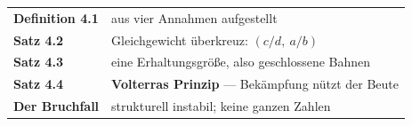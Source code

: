 \begin{merksatz}
\begin{center}
\renewcommand{\arraystretch}{1.5}
\begin{tabular}{@{}P{3.0cm}P{5.6cm}@{}}
\toprule
\textbf{Definition 4.1} & aus vier Annahmen aufgestellt\\
\textbf{Satz 4.2} & Gleichgewicht überkreuz: $(c/d,\ a/b)$\\
\textbf{Satz 4.3} & eine Erhaltungsgröße, also geschlossene Bahnen\\
\textbf{Satz 4.4} & \textbf{Volterras Prinzip} --- Bekämpfung nützt der Beute\\
\textbf{Der Bruchfall} & strukturell instabil; keine ganzen Zahlen\\
\bottomrule
\end{tabular}
\end{center}

\begin{center}
\begin{minipage}{0.88\textwidth}
\end{minipage}
\end{center}
\end{merksatz}
